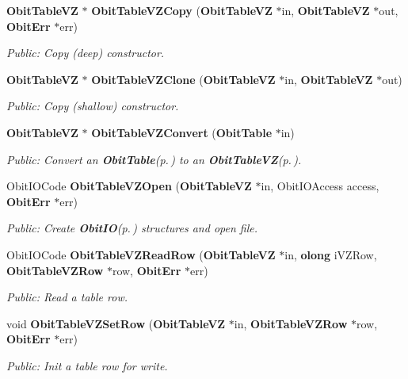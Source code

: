 \begin{CompactItemize}
{\bf Obit\-Table\-VZ} $\ast$ {\bf Obit\-Table\-VZCopy} ({\bf Obit\-Table\-VZ} $\ast$in, {\bf Obit\-Table\-VZ} $\ast$out, {\bf Obit\-Err} $\ast$err)
\begin{CompactList}\small\item\em Public: Copy (deep) constructor. \item\end{CompactList}\item 
{\bf Obit\-Table\-VZ} $\ast$ {\bf Obit\-Table\-VZClone} ({\bf Obit\-Table\-VZ} $\ast$in, {\bf Obit\-Table\-VZ} $\ast$out)
\begin{CompactList}\small\item\em Public: Copy (shallow) constructor. \item\end{CompactList}\item 
{\bf Obit\-Table\-VZ} $\ast$ {\bf Obit\-Table\-VZConvert} ({\bf Obit\-Table} $\ast$in)
\begin{CompactList}\small\item\em Public: Convert an {\bf Obit\-Table}{\rm (p.\,\pageref{structObitTable})} to an {\bf Obit\-Table\-VZ}{\rm (p.\,\pageref{structObitTableVZ})}. \item\end{CompactList}\item 
Obit\-IOCode {\bf Obit\-Table\-VZOpen} ({\bf Obit\-Table\-VZ} $\ast$in, Obit\-IOAccess access, {\bf Obit\-Err} $\ast$err)
\begin{CompactList}\small\item\em Public: Create {\bf Obit\-IO}{\rm (p.\,\pageref{structObitIO})} structures and open file. \item\end{CompactList}\item 
Obit\-IOCode {\bf Obit\-Table\-VZRead\-Row} ({\bf Obit\-Table\-VZ} $\ast$in, {\bf olong} i\-VZRow, {\bf Obit\-Table\-VZRow} $\ast$row, {\bf Obit\-Err} $\ast$err)
\begin{CompactList}\small\item\em Public: Read a table row. \item\end{CompactList}\item 
void {\bf Obit\-Table\-VZSet\-Row} ({\bf Obit\-Table\-VZ} $\ast$in, {\bf Obit\-Table\-VZRow} $\ast$row, {\bf Obit\-Err} $\ast$err)
\begin{CompactList}\small\item\em Public: Init a table row for write. \item\end{CompactList}\item 

\end{CompactItemize}
